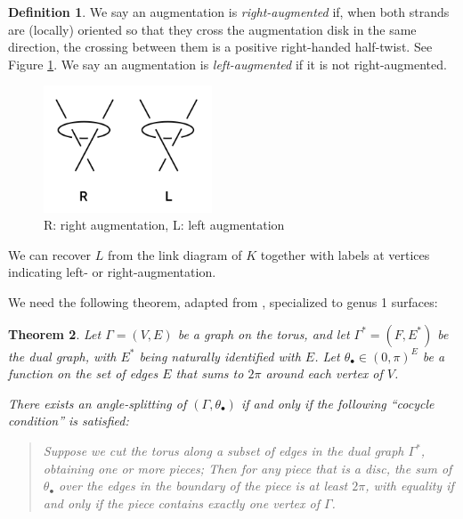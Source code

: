 \documentclass[11pt]{amsart}
\theoremstyle{plain}
\newtheorem{theorem}{Theorem}[section]
\theoremstyle{definition}
\newtheorem{define}[theorem]{Definition}
\begin{document}
\begin{define}
We say an augmentation is \emph{right-augmented} if, when both strands are
(locally) oriented so that they cross the augmentation disk in the same
direction, the crossing between them is a positive right-handed half-twist.
See Figure \ref{f:right_left_aug}.
We say an augmentation is \emph{left-augmented} if it is not right-augmented.
\end{define}

\begin{figure}
\includegraphics[width=5cm]{more_pictures/right_left_aug.png}
\caption{R: right augmentation, L: left augmentation}
\label{f:right_left_aug}
\end{figure}

We can recover $L$ from the link diagram of $K$
together with labels at vertices indicating left- or right-augmentation.


We need the following theorem,
adapted from \cite[Theorem 4]{BandS},
specialized to genus 1 surfaces:


\begin{theorem}{\cite[Theorem 4]{BandS}}
Let $\Gamma = (V,E)$ be a graph on the torus,
and let $\Gamma^* = (F,E^*)$ be the dual graph,
with $E^*$ being naturally identified with $E$.
Let $\theta_\bullet \in (0,\pi)^E$
be a function on the set of edges $E$
that sums to $2\pi$ around each vertex of $V$.


There exists an angle-splitting of $(\Gamma,\theta_\bullet)$
if and only if the following
``cocycle condition'' is satisfied:

\begin{quotation}
Suppose we cut the torus along a subset of edges in the dual graph
$\Gamma^*$, obtaining one or more pieces;
Then for any piece that is a disc,
the sum of $\theta_\bullet$ over the edges in the boundary
of the piece is at least $2\pi$,
with equality if and only if the piece
contains exactly one vertex of $\Gamma$.
\end{quotation}

\label{t:bs-thm4}
\end{theorem}
\end{document}
